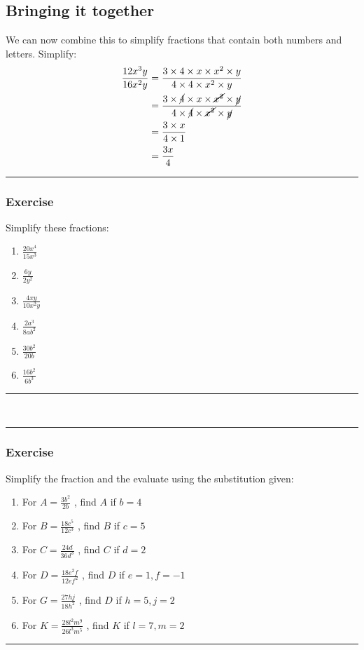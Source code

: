 \documentclass[a4paper,12pt]{article}
\newcommand\question{
	 \rule[0pt]{17cm}{0.5pt}\vspace{-0.5cm}
	\subsubsection{Exercise}

}
\newcommand\questionend{
	\rule[0pt]{17cm}{0.5pt}\vspace{0.0cm}\\
}
\begin{document}
\subsection{Bringing it together}
We can now combine this to simplify fractions that contain both numbers and letters.
Simplify:
\begin{align*}
\frac{12x^3y}{16x^2y}&= \frac{3 \times 4 \times x \times x^2 \times y }{4 \times 4 \times x^2 \times y}\\
                                     &= \frac{3 \times \cancel{4} \times x \times \cancel{x^2}  \times \cancel{y}  }{4 \times \cancel{4}  \times \cancel{x^2} \times \cancel{y} }\\
                                     & =  \frac{3  \times x    }{4   \times 1 }\\
                                     &= \frac{3x}{4}
\end{align*}
\question
Simplify these fractions:
\begin{multicols}{3}
	\begin{enumerate}[label=\normalsize \alph*)~~~ , topsep=8pt,itemsep=25pt,partopsep=4pt, parsep=4pt]
		\item $\displaystyle \frac{20x^4}{15x^3}$
		\item $\displaystyle \frac{6y}{2y^2}$
		\item $\displaystyle \frac{4xy}{10x^2y}$
		\item $\displaystyle \frac{2a^3}{8ab^2}$
		\item $\displaystyle \frac{30b^2}{20b}$
		\item $\displaystyle \frac{16b^2}{6b^3}$
	\end{enumerate}
\end{multicols}
\questionend
\question
Simplify the fraction and the evaluate using the substitution given:
\begin{multicols}{2}
	\begin{enumerate}[label=\normalsize \alph*)~~~ , topsep=8pt,itemsep=25pt,partopsep=4pt, parsep=4pt]
\item For $\displaystyle A = \frac{3b^2}{2b}$ , find $A$ if $b=4$
\item For $\displaystyle B = \frac{18c^5}{12c^3}$ , find $B$ if $c=5$
\item For $\displaystyle C = \frac{24d}{36d^3}$ , find $C$ if $d=2$
\item For $\displaystyle D = \frac{18e^2f}{12ef^2}$ , find $D$ if $e=1, f=-1$
\item For $\displaystyle G = \frac{27hj}{18h^2}$ , find $D$ if $h=5, j=2$
\item For $\displaystyle K = \frac{28l^2m^9}{26l^3m^5}$ , find $K$ if $l=7, m=2$
	\end{enumerate}
\end{multicols}
\questionend
\end{document}
